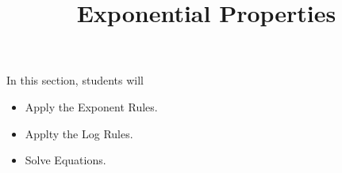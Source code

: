 \documentclass{ximera}
\title{Exponential Properties}
\begin{document}
\begin{abstract}
\end{abstract}
\maketitle




















\begin{sectionOutcomes}
In this section, students will 

\begin{itemize}
\item Apply the Exponent Rules.
\item Applty the Log Rules.
\item Solve Equations.
\end{itemize}
\end{sectionOutcomes}
\end{document}
